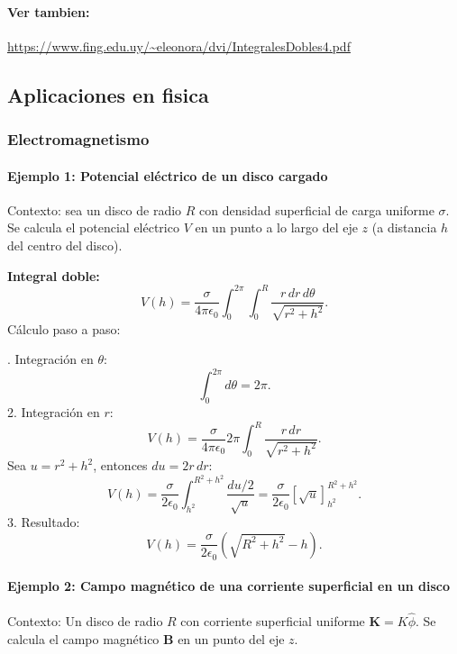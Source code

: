 \documentclass[11pt]{book}
\theoremstyle{definicion}
\theoremstyle{teorema}
\theoremstyle{ejemplo}
\begin{document}
\paragraph{Ver tambien:}
\url{https://www.fing.edu.uy/~eleonora/dvi/IntegralesDobles4.pdf}

\subsection{Aplicaciones en fisica}

\subsubsection{Electromagnetismo}

\paragraph{Ejemplo 1: Potencial eléctrico de un disco cargado}
Contexto: sea un disco de radio \( R \) con densidad superficial de carga uniforme \( \sigma \). Se calcula el potencial eléctrico \( V \) en un punto a lo largo del eje \( z \) (a distancia \( h \) del centro del disco).

\medskip

%
\noindent
\textbf{Integral doble:}
\[
V(h) = \frac{\sigma}{4\pi\epsilon_0} \int_{0}^{2\pi} \int_{0}^{R} \frac{r \, dr \, d\theta}{\sqrt{r^2 + h^2}}.
\]
%
Cálculo paso a paso:

. Integración en \( \theta \):
   \[
   \int_{0}^{2\pi} d\theta = 2\pi.
   \]
2. Integración en \( r \):
   \[
   V(h) = \frac{\sigma}{4\pi\epsilon_0} 2\pi \int_{0}^{R} \frac{r \, dr}{\sqrt{r^2 + h^2}}.
   \]
   Sea \( u = r^2 + h^2 \), entonces \( du = 2r \, dr \):
   \[
   V(h) = \frac{\sigma}{2\epsilon_0} \int_{h^2}^{R^2 + h^2} \frac{du/2}{\sqrt{u}} = \frac{\sigma}{2\epsilon_0} \left[ \sqrt{u} \right]_{h^2}^{R^2 + h^2}.
   \]
3. Resultado:
   \[
   V(h) = \frac{\sigma}{2\epsilon_0} \left( \sqrt{R^2 + h^2} - h \right).
   \]

\paragraph{Ejemplo 2: Campo magnético de una corriente superficial en un disco}
Contexto: Un disco de radio \( R \) con corriente superficial uniforme \( \mathbf{K} = K \hat{\phi} \). Se calcula el campo magnético \( \mathbf{B} \) en un punto del eje \( z \).

\medskip
\end{document}
